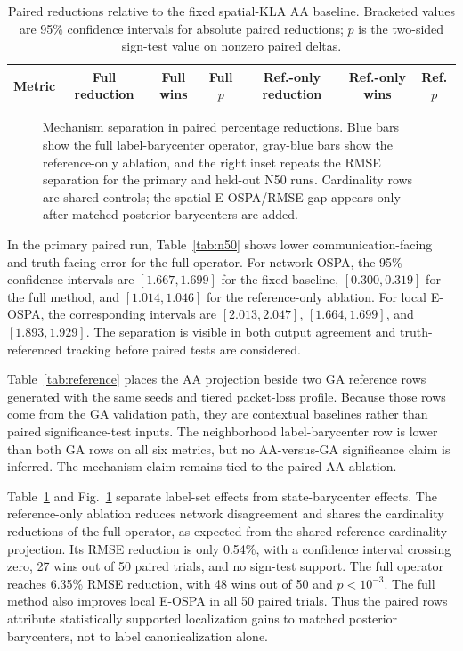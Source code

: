 \documentclass{IEEEtaes}
\newcommand{\method}{neighborhood label-barycenter}
\begin{document}
\begin{table}[t]
\caption{Paired reductions relative to the fixed spatial-KLA AA baseline. Bracketed values are 95\% confidence intervals for absolute paired reductions; $p$ is the two-sided sign-test value on nonzero paired deltas.}
\label{tab:paired}
\centering
\tablefont
\begin{tabular}{lcccccc}
\toprule
Metric & Full reduction & Full wins & Full $p$ & Ref.-only reduction & Ref.-only wins & Ref. $p$\\
\midrule

\end{tabular}
\end{table}

\begin{figure}[t]
\centering

\caption{Mechanism separation in paired percentage reductions. Blue bars show the full label-barycenter operator, gray-blue bars show the reference-only ablation, and the right inset repeats the RMSE separation for the primary and held-out N50 runs. Cardinality rows are shared controls; the spatial E-OSPA/RMSE gap appears only after matched posterior barycenters are added.}
\label{fig:n50}
\end{figure}

In the primary paired run, Table~\ref{tab:n50} shows lower communication-facing and truth-facing error for the full operator. For network OSPA, the 95\% confidence intervals are $[1.667,1.699]$ for the fixed baseline, $[0.300,0.319]$ for the full method, and $[1.014,1.046]$ for the reference-only ablation. For local E-OSPA, the corresponding intervals are $[2.013,2.047]$, $[1.664,1.699]$, and $[1.893,1.929]$. The separation is visible in both output agreement and truth-referenced tracking before paired tests are considered.

Table~\ref{tab:reference} places the AA projection beside two GA reference rows generated with the same seeds and tiered packet-loss profile. Because those rows come from the GA validation path, they are contextual baselines rather than paired significance-test inputs. The \method{} row is lower than both GA rows on all six metrics, but no AA-versus-GA significance claim is inferred. The mechanism claim remains tied to the paired AA ablation.

Table~\ref{tab:paired} and Fig.~\ref{fig:n50} separate label-set effects from state-barycenter effects. The reference-only ablation reduces network disagreement and shares the cardinality reductions of the full operator, as expected from the shared reference-cardinality projection. Its RMSE reduction is only 0.54\%, with a confidence interval crossing zero, 27 wins out of 50 paired trials, and no sign-test support. The full operator reaches 6.35\% RMSE reduction, with 48 wins out of 50 and $p<10^{-3}$. The full method also improves local E-OSPA in all 50 paired trials. Thus the paired rows attribute statistically supported localization gains to matched posterior barycenters, not to label canonicalization alone.
\end{document}
